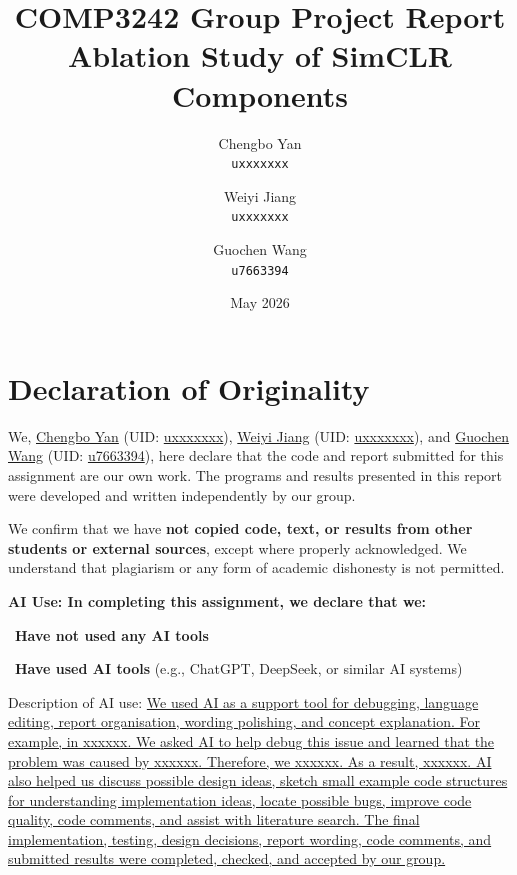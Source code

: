 \documentclass[10pt]{article}
\title{COMP3242 Group Project Report\\Ablation Study of SimCLR Components}
\author{
Chengbo Yan \\ \texttt{uxxxxxxx}
\and
Weiyi Jiang \\ \texttt{uxxxxxxx}
\and
Guochen Wang \\ \texttt{u7663394}
}
\date{May 2026}
\begin{document}
\maketitle

\section{Declaration of Originality}

\vspace{0.8em}

We, \underline{Chengbo Yan} (UID: \underline{uxxxxxxx}), \underline{Weiyi Jiang} (UID: \underline{uxxxxxxx}), and \underline{Guochen Wang} (UID: \underline{u7663394}), here declare that the code and report submitted for this assignment are our own work. The programs and results presented in this report were developed and written
independently by our group.

\vspace{0.8em}

We confirm that we have \textbf{not copied code, text, or results from other
students or external sources}, except where properly acknowledged. We understand
that plagiarism or any form of academic dishonesty is not permitted.

\vspace{1em}

\textbf{AI Use: In completing this assignment, we declare that we:}

\fbox{\rule{0pt}{1.1ex}\rule{1.1ex}{0pt}}~\textbf{Have not used any AI tools}

~\textbf{Have used AI tools} (e.g., ChatGPT, DeepSeek, or similar AI systems)

\vspace{1em}

Description of AI use: \uline{We used AI as a support tool for debugging, language editing, report organisation, wording polishing, and concept explanation. For example, in xxxxxx. We asked AI to help debug this issue and learned that the problem was caused by xxxxxx. Therefore, we xxxxxx. As a result, xxxxxx. AI also helped us discuss possible design ideas, sketch small example code structures for understanding implementation ideas, locate possible bugs, improve code quality, code comments, and assist with literature search. The final implementation, testing, design decisions, report wording, code comments, and submitted results were completed, checked, and accepted by our group.}
\vspace{1em}
\end{document}
